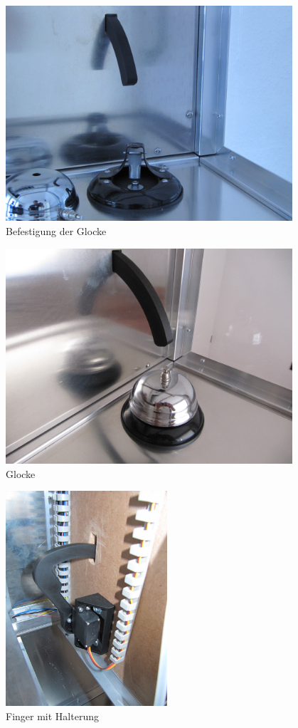 \documentclass[a4paper]{scrartcl}
\begin{document}
\begin{figure}
  \centering
  \includegraphics[height=8cm]{pics/bell_mount.JPG}
  \caption{Befestigung der Glocke} \label{bell_mount}
\end{figure}

\begin{figure}
  \centering
  \includegraphics[height=8cm]{pics/bell.JPG}
  \caption{Glocke} \label{bell}
\end{figure}

\begin{figure}
  \centering
  \includegraphics[height=8cm]{pics/finger.JPG}
  \caption{Finger mit Halterung} \label{finger}
\end{figure}
\end{document}
